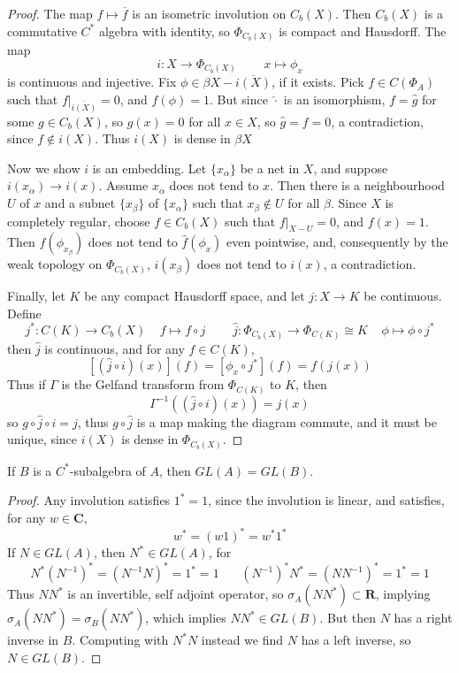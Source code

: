 \begin{proof}
    The map $f \mapsto \overline{f}$ is an isometric involution on $C_b(X)$. Then $C_b(X)$ is a commutative $C^*$ algebra with identity, so $\Phi_{C_b(X)}$ is compact and Hausdorff. The map
    \[ i: X \to \Phi_{C_b(X)}\ \ \ \ \ \ \ \ \ \ x \mapsto \phi_x \]
    is continuous and injective. Fix $\phi \in \beta X - \overline{i(X)}$, if it exists. Pick $f \in C(\Phi_A)$ such that $f|_{\overline{i(X)}} = 0$, and $f(\phi) = 1$. But since $\widehat{\cdot}$ is an isomorphism, $f = \widehat{g}$ for some $g \in C_b(X)$, so $g(x) = 0$ for all $x \in X$, so $\widehat{g} = f = 0$, a contradiction, since $f \not \in i(X)$. Thus $i(X)$ is dense in $\beta X$

    Now we show $i$ is an embedding. Let $\{ x_\alpha \}$ be a net in $X$, and suppose $i(x_\alpha) \to i(x)$. Assume $x_\alpha$ does not tend to $x$. Then there is a neighbourhood $U$ of $x$ and a subnet $\{ x_\beta \}$ of $\{ x_\alpha \}$ such that $x_\beta \not \in U$ for all $\beta$. Since $X$ is completely regular, choose $f \in C_b(X)$ such that $f|_{X - U} = 0$, and $f(x) = 1$. Then $\widehat{f}(\phi_{x_\beta})$ does not tend to $\widehat{f}(\phi_x)$ even pointwise, and, consequently by the weak topology on $\Phi_{C_b(X)}$, $i(x_\beta)$ does not tend to $i(x)$, a contradiction.

    Finally, let $K$ be any compact Hausdorff space, and let $j: X \to K$ be continuous. Define
    \[ j^*: C(K) \to C_b(X)\ \ \ \ \ f \mapsto f \circ j\ \ \ \ \ \ \ \ \ \ \widehat{j}: \Phi_{C_b(X)} \to \Phi_{C(K)} \cong K\ \ \ \ \ \phi \mapsto \phi \circ j^* \]
    then $\widehat{j}$ is continuous, and for any $f \in C(K)$,
    \[ [(\widehat{j} \circ i)(x)](f) = [\phi_x \circ j^*](f) = f(j(x)) \]
    Thus if $\Gamma$ is the Gelfand transform from $\Phi_{C(K)}$ to $K$, then
    \[ \Gamma^{-1}((\widehat{j} \circ i)(x)) = j(x) \]
    so $g \circ \widehat{j} \circ i = j$, thus $g \circ \widehat{j}$ is a map making the diagram commute, and it must be unique, since $i(X)$ is dense in $\Phi_{C_b(X)}$.
\end{proof}

\begin{theorem}
    If  $B$ is a $C^*$-subalgebra of $A$, then $GL(A) = GL(B)$.
\end{theorem}
\begin{proof}
    Any involution satisfies $1^* = 1$, since the involution is linear, and satisfies, for any $w \in \mathbf{C}$,
    \[ w^* = (w1)^* = w^*1^* \]
    If $N \in GL(A)$, then $N^* \in GL(A)$, for
    \[ N^*(N^{-1})^* = (N^{-1}N)^* = 1^* = 1\ \ \ \ \ \ \ \ (N^{-1})^* N^* = (NN^{-1})^* = 1^* = 1 \]
    Thus $NN^*$ is an invertible, self adjoint operator, so $\sigma_A(NN^*) \subset \mathbf{R}$, implying $\sigma_A(NN^*) = \sigma_B(NN^*)$, which implies $NN^* \in GL(B)$. But then $N$ has a right inverse in $B$. Computing with $N^*N$ instead we find $N$ has a left inverse, so $N \in GL(B)$.
\end{proof}


